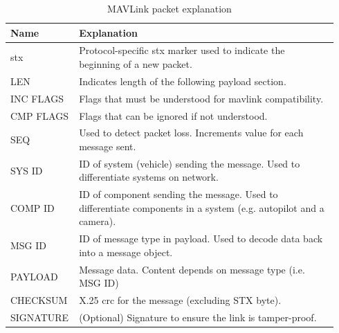 \begin{table}[!h]
  \centering
  \begin{tabular}{ | >{\centering\arraybackslash}m{0.16\linewidth} | >{\arraybackslash}m{0.78\linewidth} | }
    \hline
    \textbf{Name} & \textbf{Explanation} \\
    \hline
    \acs{stx} & Protocol\hyp{}specific \ac{stx} marker used to indicate the beginning of a new packet. \\
    \hline
    LEN & Indicates length of the following payload section. \\
    \hline
    INC FLAGS & Flags that must be understood for \acs{mavlink} compatibility. \\
    \hline
    CMP FLAGS & Flags that can be ignored if not understood. \\
    \hline
    SEQ & Used to detect packet loss. Increments value for each message sent. \\
    \hline
    SYS ID & ID of system (vehicle) sending the message. Used to differentiate systems on network. \\
    \hline
    COMP ID & ID of component sending the message. Used to differentiate components in a system (e.g. autopilot and a camera). \\
    \hline
    MSG ID & ID of message type in payload. Used to decode data back into a message object. \\
    \hline
    PAYLOAD & Message data. Content depends on message type (i.e. MSG ID) \\
    \hline
    CHECKSUM & X.25 \acs{crc} for the message (excluding STX byte). \\
    \hline
    SIGNATURE & (Optional) Signature to ensure the link is tamper\hyp{}proof. \\
    \hline
  \end{tabular}
  \caption{MAVLink packet explanation}
\end{table}